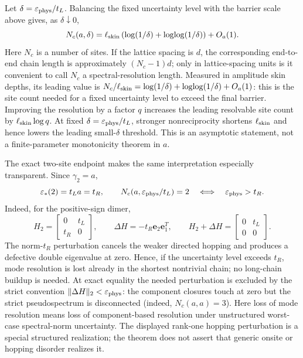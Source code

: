 \documentclass[review,hidelinks,onefignum,onetabnum]{siamart251216}
\begin{document}
Let \(\delta=\varepsilon_{\rm phys}/t_L\).  Balancing the fixed uncertainty
level with the barrier scale above gives, as \(\delta\downarrow0\),
\[
 N_c(a,\delta)=\ell_{\rm skin}
\left(\log(1/\delta)+\log\!\log(1/\delta)\right)+O_a(1).
\]
Here \(N_c\) is a number of sites.  If the lattice spacing is \(d\), the
corresponding end-to-end chain length is approximately \((N_c-1)d\); only in
lattice-spacing units is it convenient to call \(N_c\) a
spectral-resolution length.  Measured in amplitude skin depths, its leading
value is
\(N_c/\ell_{\rm skin}=\log(1/\delta)+\log\!\log(1/\delta)+O_a(1)\): this is
the site count needed for a fixed uncertainty level to exceed the final
barrier.  Improving the resolution by a factor \(q\) increases the leading
resolvable site count by \(\ell_{\rm skin}\log q\).  At fixed
\(\delta=\varepsilon_{\rm phys}/t_L\), stronger nonreciprocity shortens
\(\ell_{\rm skin}\) and hence lowers the leading small-\(\delta\) threshold.
This is an asymptotic statement, not a finite-parameter monotonicity theorem
in \(a\).

The exact two-site endpoint makes the same interpretation especially
transparent.  Since \(\gamma_2=a\),
\[
 \varepsilon_*(2)=t_La=t_R,
 \qquad
 N_c(a,\varepsilon_{\rm phys}/t_L)=2
 \quad\Longleftrightarrow\quad
 \varepsilon_{\rm phys}>t_R.
\]
Indeed, for the positive-sign dimer,
\[
 H_2=\begin{bmatrix}0&t_L\\t_R&0\end{bmatrix},
 \qquad
 \Delta H=-t_R\mathbf e_2\mathbf e_1^T,
 \qquad
 H_2+\Delta H=\begin{bmatrix}0&t_L\\0&0\end{bmatrix}.
\]
The norm-\(t_R\) perturbation cancels the weaker directed hopping and
produces a defective double eigenvalue at zero.  Hence, if the uncertainty
level exceeds \(t_R\), mode resolution is lost already in the shortest
nontrivial chain; no long-chain buildup is needed.  At exact equality the
needed perturbation is excluded by the strict convention
\(\lVert\Delta H\rVert_2<\varepsilon_{\rm phys}\): the component closures
touch at zero but the strict pseudospectrum is disconnected (indeed,
\(N_c(a,a)=3\)).
Here loss of mode resolution means loss of component-based resolution under
unstructured worst-case spectral-norm uncertainty.  The displayed rank-one
hopping perturbation is a special structured realization; the theorem does
not assert that generic onsite or hopping disorder realizes it.
\end{document}
